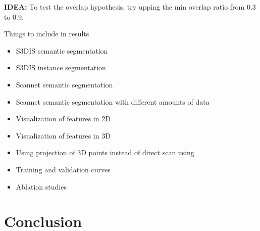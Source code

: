 \documentclass[10pt,twocolumn,letterpaper]{article}
\begin{document}
\textbf{IDEA:} To test the overlap hypothesis, try upping the min overlap ratio from 0.3 to 0.9.

Things to include in results
\begin{itemize}
    \item S3DIS semantic segmentation
    \item S3DIS instance segmentation
    \item Scannet semantic segmentation
    \item Scannet semantic segmentation with different amounts of data
    \item Visualization of features in 2D
    \item Visualization of features in 3D
    \item Using projection of 3D points instead of direct scan using \cite{katz2007Direct}
    \item Training and validation curves
    \item Ablation studies
\end{itemize}

\section{Conclusion}
\label{sec:conclusion}



\newpage
{\small
    
    
}
\end{document}
